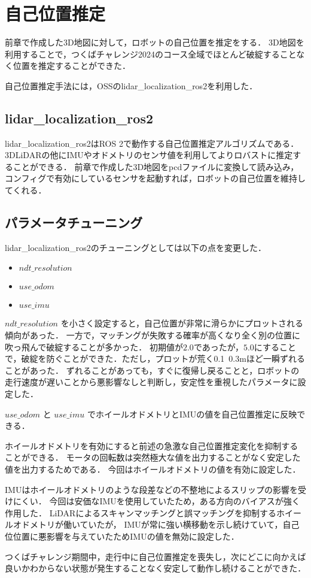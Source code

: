 \section{自己位置推定}
前章で作成した3D地図に対して，ロボットの自己位置を推定をする．
3D地図を利用することで，つくばチャレンジ2024のコース全域でほとんど破綻することなく位置を推定することができた．

自己位置推定手法には，OSSのlidar\_localization\_ros2\cite{Localization}を利用した．

\subsection{lidar\_localization\_ros2}
lidar\_localization\_ros2はROS 2で動作する自己位置推定アルゴリズムである．
3DLiDARの他にIMUやオドメトリのセンサ値を利用してよりロバストに推定することができる．
前章で作成した3D地図をpcdファイルに変換して読み込み，コンフィグで有効にしているセンサを起動すれば，ロボットの自己位置を維持してくれる．

\subsection{パラメータチューニング}
lidar\_localization\_ros2のチューニングとしては以下の点を変更した．
\begin{itemize}
    \item $ndt\_resolution$
    \item $use\_odom$
    \item $use\_imu$
\end{itemize}

$ndt\_resolution$ を小さく設定すると，自己位置が非常に滑らかにプロットされる傾向があった．
一方で，マッチングが失敗する確率が高くなり全く別の位置に吹っ飛んで破綻することが多かった．
初期値が$2.0$であったが，$5.0$にすることで，破綻を防ぐことができた．ただし，プロットが荒く0.1~0.3mほど一瞬ずれることがあった．
ずれることがあっても，すぐに復帰し戻ることと，ロボットの走行速度が遅いことから悪影響なしと判断し，安定性を重視したパラメータに設定した．

$use\_odom$ と $use\_imu$ でホイールオドメトリとIMUの値を自己位置推定に反映できる．

ホイールオドメトリを有効にすると前述の急激な自己位置推定変化を抑制することができる．
モータの回転数は突然極大な値を出力することがなく安定した値を出力するためである．
今回はホイールオドメトリの値を有効に設定した．

IMUはホイールオドメトリのような段差などの不整地によるスリップの影響を受けにくい．
今回は安価なIMUを使用していたため，ある方向のバイアスが強く作用した．
LiDARによるスキャンマッチングと誤マッチングを抑制するホイールオドメトリが働いていたが，
IMUが常に強い横移動を示し続けていて，自己位位置に悪影響を与えていたためIMUの値を無効に設定した．

つくばチャレンジ期間中，走行中に自己位置推定を喪失し，次にどこに向かえば良いかわからない状態が発生することなく安定して動作し続けることができた．